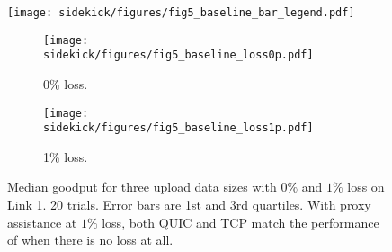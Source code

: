 \begin{figure}[t]
\centering
\texttt{[image: sidekick/figures/fig5\_baseline\_bar\_legend.pdf]}
\begin{subfigure}{0.49\linewidth}
	\texttt{[image: sidekick/figures/fig5\_baseline\_loss0p.pdf]}
	\caption{0\% loss.}
	\label{fig:sidekick:fairness-bar:loss0p}
\end{subfigure}
\begin{subfigure}{0.49\linewidth}
	\texttt{[image: sidekick/figures/fig5\_baseline\_loss1p.pdf]}
	\caption{1\% loss.}
	\label{fig:sidekick:fairness-bar:loss1p}
\end{subfigure}
\caption{Median goodput for three upload data sizes with $0\%$ and $1\%$ loss on
Link 1. 20 trials. Error bars are 1st and 3rd quartiles.
With proxy assistance at $1\%$
loss, both QUIC and TCP match the performance of when there is no loss at all.
}
\label{fig:sidekick:fairness-bar}
\end{figure}
